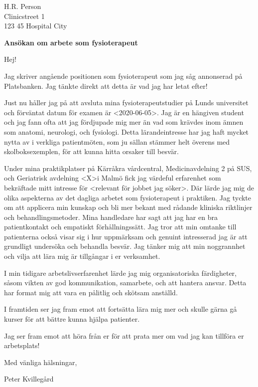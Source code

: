 \documentclass[10pt,a4paper]{letter}
\begin{document}
 
	\begin{letter}{H.R. Person \\ Clinicstreet 1 \\ 123 45 Hospital City} 
		
\opening{\textbf{Ansökan om arbete som fysioterapeut}}
Hej!

Jag skriver angående positionen som fysioterapeut som jag såg annonserad på Platsbanken. Jag tänkte direkt att detta är vad jag har letat efter!

Just nu håller jag på att avsluta mina fysioterapeutstudier på Lunds universitet och förväntat datum för examen är \textless 2020-06-05\textgreater. Jag är en hängiven student och jag fann ofta att jag fördjupade mig mer än vad som krävdes inom ämnen som anatomi, neurologi, och fysiologi. Detta lärandeintresse har jag haft mycket nytta av i verkliga patientmöten, som ju sällan stämmer helt överens med skolboksexemplen, för att kunna hitta orsaker till besvär.

Under mina praktikplatser på Kärråkra vårdcentral, Medicinavdelning 2 på SUS, och Geriatrisk avdelning \textless X\textgreater i Malmö fick jag värdeful erfarenhet som bekräftade mitt intresse för \textless relevant för jobbet jag söker\textgreater. Där lärde jag mig de olika aspekterna av det dagliga arbetet som fysioterapeut i praktiken. Jag tyckte om att applicera min kunskap och bli mer bekant med rådande kliniska riktlinjer och behandlingsmetoder. Mina handledare har sagt att jag har en bra patientkontakt och empatiskt förhållningssätt. Jag tror att min omtanke till patienterna också visar sig i hur uppmärksam och genuint intresserad jag är att grundligt undersöka och behandla besvär. Jag tänker mig att min noggrannhet och vilja att lära mig är tillgångar i er verksamhet.

I min tidigare arbetslivserfarenhet lärde jag mig organisatoriska färdigheter, såsom vikten av god kommunikation, samarbete, och att hantera ansvar. Detta har format mig att vara en pålitlig och skötsam anställd.

I framtiden ser jag fram emot att fortsätta lära mig mer och skulle gärna gå kurser för att bättre kunna hjälpa patienter.

Jag ser fram emot att höra från er för att prata mer om vad jag kan tillföra er arbetsplats!
	
\vspace{1em}
\hspace{0.1\linewidth}Med vänliga hälsningar,

\hspace{0.1\linewidth}Peter Kvillegård
		 
 
\end{letter} 
\end{document}
